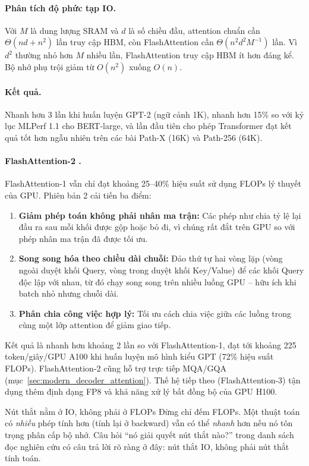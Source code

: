 \paragraph{Phân tích độ phức tạp IO.}
Với $M$ là dung lượng SRAM và $d$ là số chiều đầu, attention chuẩn cần $\Theta(nd + n^2)$ lần truy cập HBM, còn FlashAttention cần $\Theta(n^2 d^2 M^{-1})$ lần. Vì $d^2$ thường nhỏ hơn $M$ nhiều lần, FlashAttention truy cập HBM ít hơn đáng kể. Bộ nhớ phụ trội giảm từ $O(n^2)$ xuống $O(n)$.

\paragraph{Kết quả.} Nhanh hơn 3 lần khi huấn luyện GPT-2 (ngữ cảnh 1K), nhanh hơn 15\% so với kỷ lục MLPerf 1.1 cho BERT-large, và lần đầu tiên cho phép Transformer đạt kết quả tốt hơn ngẫu nhiên trên các bài Path-X (16K) và Path-256 (64K).

\paragraph{FlashAttention-2 \cite{dao2024flashattention2}.}
FlashAttention-1 vẫn chỉ đạt khoảng 25--40\% hiệu suất sử dụng FLOPs lý thuyết của GPU. Phiên bản 2 cải tiến ba điểm:
\begin{enumerate}
	\item \textbf{Giảm phép toán không phải nhân ma trận:} Các phép như chia tỷ lệ lại đầu ra sau mỗi khối được gộp hoặc bỏ đi, vì chúng rất đắt trên GPU so với phép nhân ma trận đã được tối ưu.
	\item \textbf{Song song hóa theo chiều dài chuỗi:} Đảo thứ tự hai vòng lặp (vòng ngoài duyệt khối Query, vòng trong duyệt khối Key/Value) để các khối Query độc lập với nhau, từ đó chạy song song trên nhiều luồng GPU -- hữu ích khi batch nhỏ nhưng chuỗi dài.
	\item \textbf{Phân chia công việc hợp lý:} Tối ưu cách chia việc giữa các luồng trong cùng một lớp attention để giảm giao tiếp.
\end{enumerate}
Kết quả là nhanh hơn khoảng 2 lần so với FlashAttention-1, đạt tới khoảng 225 token/giây/GPU A100 khi huấn luyện mô hình kiểu GPT (72\% hiệu suất FLOPs). FlashAttention-2 cũng hỗ trợ trực tiếp MQA/GQA (mục~\ref{sec:modern_decoder_attention}). Thế hệ tiếp theo (FlashAttention-3) tận dụng thêm định dạng FP8 và khả năng xử lý bất đồng bộ của GPU H100.

\begin{deepdive}{Nút thắt nằm ở IO, không phải ở FLOPs}
Đừng chỉ đếm FLOPs. Một thuật toán có \emph{nhiều} phép tính hơn (tính lại ở backward) vẫn có thể \emph{nhanh} hơn nếu nó tôn trọng phân cấp bộ nhớ. Câu hỏi “nó giải quyết nút thắt nào?” trong danh sách đọc nghiên cứu có câu trả lời rõ ràng ở đây: nút thắt IO, không phải nút thắt tính toán.
\end{deepdive}

